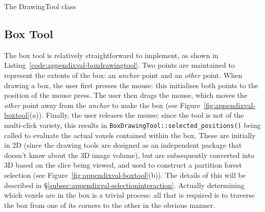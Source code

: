 \begin{stulisting}[p]
\caption{The DrawingTool class}
\label{code:appendixval-drawingtool}

\end{stulisting}

\subsection{Box Tool}

The box tool is relatively straightforward to implement, as shown in Listing~\ref{code:appendixval-boxdrawingtool}. Two points are maintained to represent the extents of the box: an \emph{anchor} point and an \emph{other} point. When drawing a box, the user first presses the mouse: this initialises both points to the position of the mouse press. The user then drags the mouse, which moves the \emph{other} point away from the \emph{anchor} to make the box (see Figure~\ref{fig:appendixval-boxtool}(a)). Finally, the user releases the mouse; since the tool is not of the multi-click variety, this results in \texttt{BoxDrawingTool::selected_positions()} being called to evaluate the actual voxels contained within the box. These are initially in 2D (since the drawing tools are designed as an independent package that doesn't know about the 3D image volume), but are subsequently converted into 3D based on the slice being viewed, and used to construct a partition forest selection (see Figure~\ref{fig:appendixval-boxtool}(b)). The details of this will be described in \S\ref{subsec:appendixval-selectioninteraction}. Actually determining which voxels are in the box is a trivial process: all that is required is to traverse the box from one of its corners to the other in the obvious manner.


